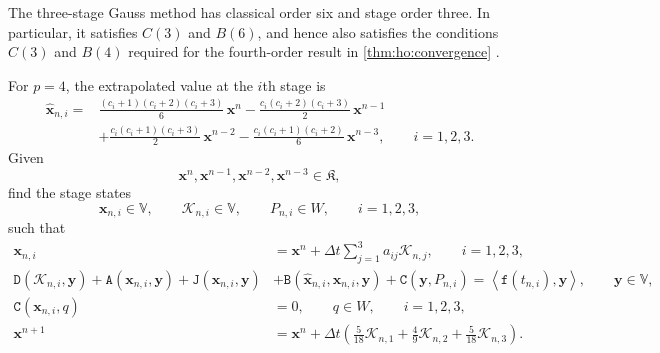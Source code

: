 \documentclass[11pt,a4paper]{article}
\newcommand{\bs}{\boldsymbol}
\newcommand{\dt}{\Delta t}
\newcommand{\V}{\mathbb V}
\newcommand{\DD}{\mathtt D}
\newcommand{\Aform}{\mathtt A}
\newcommand{\JJ}{\mathtt J}
\newcommand{\BB}{\mathtt B}
\newcommand{\CC}{\mathtt C}
\newcommand{\ff}{\mathtt f}
\newcommand{\dual}[2]{\left\langle#1,#2\right\rangle}
\theoremstyle{definition}
\numberwithin{equation}{section}
\begin{document}
The three-stage Gauss method has classical order six and stage order
three. In particular, it satisfies \(C(3)\) and \(B(6)\), and hence
also satisfies the conditions \(C(3)\) and \(B(4)\) required for the
fourth-order result in \cref{thm:ho:convergence}
\cite{HO_HairerWanner1996}.
%

For \(p=4\), the extrapolated value at the \(i\)th stage is
\begin{equation}\label{eq:ho:fourth-predictor}
\begin{aligned}
 \widehat{\bs x}_{n,i}
 ={}&
 \frac{(c_i+1)(c_i+2)(c_i+3)}6\,\bs x^n
 -\frac{c_i(c_i+2)(c_i+3)}2\,\bs x^{n-1}
 \\[1mm]
 &+
 \frac{c_i(c_i+1)(c_i+3)}2\,\bs x^{n-2}
 -\frac{c_i(c_i+1)(c_i+2)}6\,\bs x^{n-3},
 \qquad i=1,2,3.
\end{aligned}
\end{equation}
%
Given
\[
 \bs x^n,\bs x^{n-1},\bs x^{n-2},\bs x^{n-3}
 \in\mathfrak K,
\]
find the stage states
\[
 \bs x_{n,i}\in\V,
 \qquad
 \mathcal K_{n,i}\in\V,
 \qquad
 P_{n,i}\in W,
 \qquad i=1,2,3,
\]
such that
\begin{subequations}\label{eq:ho:Gauss-four-scheme}
\begin{align}
 \bs x_{n,i}
 &=
 \bs x^n
 +\dt\sum_{j=1}^3a_{ij}\mathcal K_{n,j},
 \qquad i=1,2,3,
 \label{eq:ho:Gauss-four-stage}
 \\[1mm]
 \DD(\mathcal K_{n,i},\bs y)
 +\Aform(\bs x_{n,i},\bs y)
 +\JJ(\bs x_{n,i},\bs y)
 &+
 \BB(\widehat{\bs x}_{n,i},\bs x_{n,i},\bs y)
 +\CC(\bs y,P_{n,i})
 =
 \dual{\ff(t_{n,i})}{\bs y},
 \qquad
 \bs y\in\V,
 \label{eq:ho:Gauss-four-stage-equation}
 \\[1mm]
 \CC(\bs x_{n,i},q)
 &=0,
 \qquad
 q\in W,
 \qquad i=1,2,3,
 \label{eq:ho:Gauss-four-constraint}
 \\[1mm]
 \bs x^{n+1}
 &=
 \bs x^n
 +\dt\left(
 \frac5{18}\mathcal K_{n,1}
 +\frac49\mathcal K_{n,2}
 +\frac5{18}\mathcal K_{n,3}
 \right).
 \label{eq:ho:Gauss-four-update}
\end{align}
\end{subequations}
\end{document}
